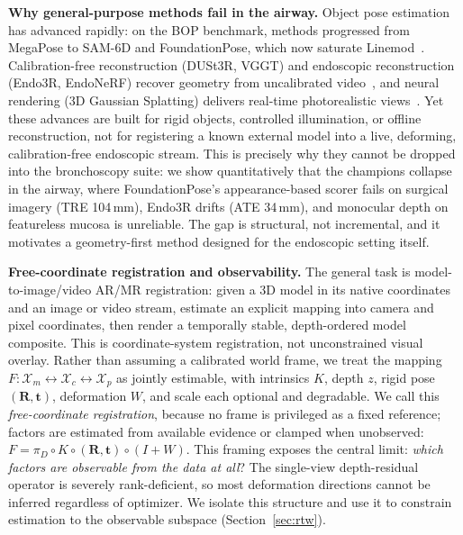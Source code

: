 \documentclass[9pt,twoside,web]{ieeecolor2}
\begin{document}
\textbf{Why general-purpose methods fail in the airway.} Object pose estimation has advanced rapidly: on the BOP benchmark, methods progressed from MegaPose to SAM-6D and FoundationPose, which now saturate Linemod~\cite{labbe2022megapose,lin2024sam6d,wen2024foundationpose}. Calibration-free reconstruction (DUSt3R, VGGT) and endoscopic reconstruction (Endo3R, EndoNeRF) recover geometry from uncalibrated video~\cite{wang2024dust3r,wang2025vggt,guo2025endo3r,wang2022endonerf}, and neural rendering (3D Gaussian Splatting) delivers real-time photorealistic views~\cite{kerbl20233dgs}. Yet these advances are built for rigid objects, controlled illumination, or offline reconstruction, not for registering a known external model into a live, deforming, calibration-free endoscopic stream. This is precisely why they cannot be dropped into the bronchoscopy suite: we show quantitatively that the champions collapse in the airway, where FoundationPose's appearance-based scorer fails on surgical imagery (TRE 104\,mm), Endo3R drifts (ATE 34\,mm), and monocular depth on featureless mucosa is unreliable. The gap is structural, not incremental, and it motivates a geometry-first method designed for the endoscopic setting itself.

\textbf{Free-coordinate registration and observability.} The general task is model-to-image/video AR/MR registration: given a 3D model in its native coordinates and an image or video stream, estimate an explicit mapping into camera and pixel coordinates, then render a temporally stable, depth-ordered model composite. This is coordinate-system registration, not unconstrained visual overlay. Rather than assuming a calibrated world frame, we treat the mapping $F:\mathcal{X}_{m}\leftrightarrow\mathcal{X}_{c}\leftrightarrow\mathcal{X}_{p}$ as jointly estimable, with intrinsics $K$, depth $z$, rigid pose $(\mathbf{R},\mathbf{t})$, deformation $W$, and scale each optional and degradable. We call this \emph{free-coordinate registration}, because no frame is privileged as a fixed reference; factors are estimated from available evidence or clamped when unobserved: $F=\pi_{D}\circ K\circ(\mathbf{R},\mathbf{t})\circ(I+W)$. This framing exposes the central limit: \emph{which factors are observable from the data at all}? The single-view depth-residual operator is severely rank-deficient, so most deformation directions cannot be inferred regardless of optimizer. We isolate this structure and use it to constrain estimation to the observable subspace (Section~\ref{sec:rtw}).
\end{document}
